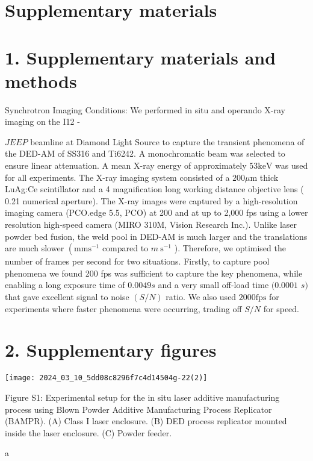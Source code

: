 \documentclass[10pt]{article}
\begin{document}
\section*{Supplementary materials}
\section*{1. Supplementary materials and methods}
Synchrotron Imaging Conditions: We performed in situ and operando X-ray imaging on the I12 -

$J E E P$ beamline at Diamond Light Source to capture the transient phenomena of the DED-AM of SS316 and Ti6242. A monochromatic beam was selected to ensure linear attenuation. A mean X-ray energy of approximately $53 \mathrm{keV}$ was used for all experiments. The X-ray imaging system consisted of a $200 \mu \mathrm{m}$ thick LuAg:Ce scintillator and a 4 magnification long working distance objective lens ( 0.21 numerical aperture). The X-ray images were captured by a high-resolution imaging camera (PCO.edge 5.5, PCO) at 200 and at up to 2,000 fps using a lower resolution high-speed camera (MIRO 310M, Vision Research Inc.). Unlike laser powder bed fusion, the weld pool in DED-AM is much larger and the translations are much slower $\left(\mathrm{mm} \mathrm{s}^{-1}\right.$ compared to $m \mathrm{~s}^{-1}$ ). Therefore, we optimised the number of frames per second for two situations. Firstly, to capture pool phenomena we found 200 fps was sufficient to capture the key phenomena, while enabling a long exposure time of $0.0049 s$ and a very small off-load time $(0.0001$ $s)$ that gave excellent signal to noise $(S / N)$ ratio. We also used $2000 \mathrm{fps}$ for experiments where faster phenomena were occurring, trading off $S / N$ for speed.

\section*{2. Supplementary figures}
\begin{center}
\texttt{[image: 2024\_03\_10\_5dd08c8296f7c4d14504g-22(2)]}
\end{center}

Figure S1: Experimental setup for the in situ laser additive manufacturing process using Blown Powder Additive Manufacturing Process Replicator (BAMPR). (A) Class I laser enclosure. (B) DED process replicator mounted inside the laser enclosure. (C) Powder feeder.

a
\end{document}
